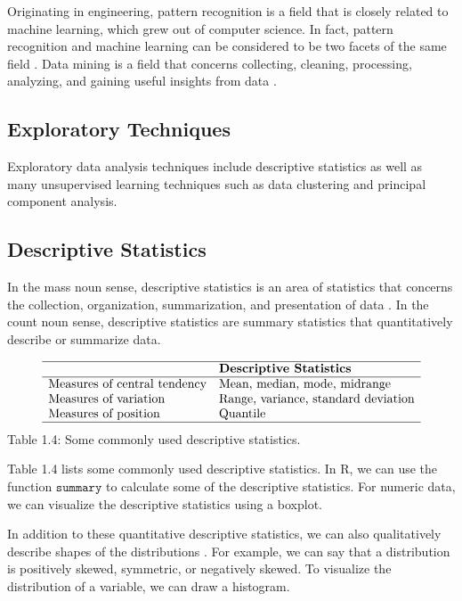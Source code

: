 \documentclass[]{book}
\theoremstyle{definition}
\theoremstyle{definition}
\theoremstyle{definition}
\theoremstyle{remark}
\begin{document}
Originating in engineering, pattern recognition is a field that is
closely related to machine learning, which grew out of computer science.
In fact, pattern recognition and machine learning can be considered to
be two facets of the same field \citep{bishop2007}. Data mining is a
field that concerns collecting, cleaning, processing, analyzing, and
gaining useful insights from data \citep{aggarwal2015}.

\subsection{Exploratory Techniques}\label{exploratory-techniques}

Exploratory data analysis techniques include descriptive statistics as
well as many unsupervised learning techniques such as data clustering
and principal component analysis.

\subsection{Descriptive Statistics}\label{descriptive-statistics}

In the mass noun sense, descriptive statistics is an area of statistics
that concerns the collection, organization, summarization, and
presentation of data \citep{bluman2012}. In the count noun sense,
descriptive statistics are summary statistics that quantitatively
describe or summarize data.

\[\begin{matrix}
\begin{array}{ll} \hline
& \textbf{Descriptive Statistics} \\\hline
\text{Measures of central tendency} & \text{Mean, median, mode, midrange}\\
\text{Measures of variation} & \text{Range, variance, standard deviation} \\
\text{Measures of position} & \text{Quantile} \\
\hline
\end{array}
\end{matrix}
\] Table 1.4: Some commonly used descriptive statistics.

Table 1.4 lists some commonly used descriptive statistics. In R, we can
use the function \(\texttt{summary}\) to calculate some of the
descriptive statistics. For numeric data, we can visualize the
descriptive statistics using a boxplot.

In addition to these quantitative descriptive statistics, we can also
qualitatively describe shapes of the distributions \citep{bluman2012}.
For example, we can say that a distribution is positively skewed,
symmetric, or negatively skewed. To visualize the distribution of a
variable, we can draw a histogram.
\end{document}
